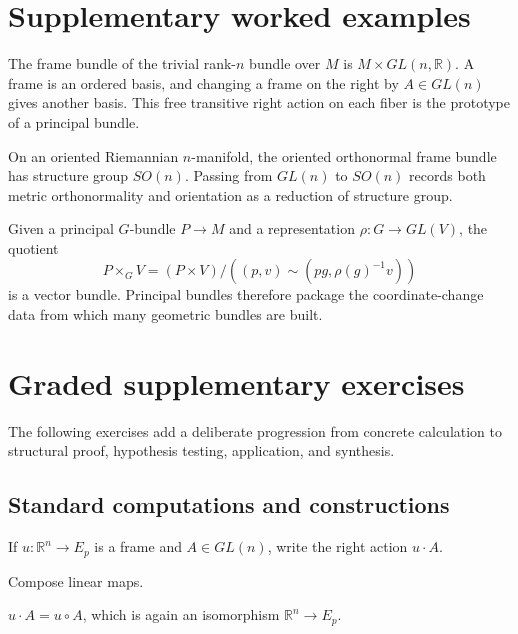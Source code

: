\section{Supplementary worked examples}
\label{sec:vii08-pedagogy}

\begin{example}\label{ex:vii08-ped-01}
The frame bundle of the trivial rank-\(n\) bundle over \(M\) is \(M\times GL(n,\mathbb R)\).  A frame is an ordered basis, and changing a frame on the right by \(A\in GL(n)\) gives another basis.  This free transitive right action on each fiber is the prototype of a principal bundle.
\end{example}

\begin{example}\label{ex:vii08-ped-02}
On an oriented Riemannian \(n\)-manifold, the oriented orthonormal frame bundle has structure group \(SO(n)\).  Passing from \(GL(n)\) to \(SO(n)\) records both metric orthonormality and orientation as a reduction of structure group.
\end{example}

\begin{example}\label{ex:vii08-ped-03}
Given a principal \(G\)-bundle \(P\to M\) and a representation \(\rho:G\to GL(V)\), the quotient
\[
P\times_G V=(P\times V)/((p,v)\sim(pg,\rho(g)^{-1}v))
\]
is a vector bundle.  Principal bundles therefore package the coordinate-change data from which many geometric bundles are built.
\end{example}

\section{Graded supplementary exercises}
The following exercises add a deliberate progression from concrete calculation to structural proof, hypothesis testing, application, and synthesis.

\subsection*{Standard computations and constructions}

\begin{exercise}\label{exr:vii08-ped-01}
If \(u:\mathbb R^n\to E_p\) is a frame and \(A\in GL(n)\), write the right action \(u\cdot A\).
\end{exercise}
\begin{hint}
Compose linear maps.
\end{hint}
\begin{solution}
\(u\cdot A=u\circ A\), which is again an isomorphism \(\mathbb R^n\to E_p\).
\end{solution}

